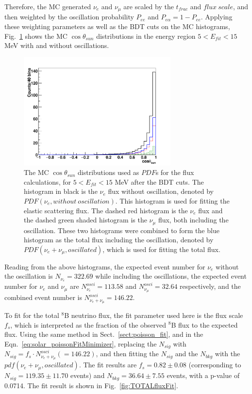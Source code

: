 Therefore, the MC generated $\nu_e$ and $\nu_\mu$ are scaled by the $t_{frac}$ and $flux~scale$, and then weighted by the oscillation probability $P_{ee}$ and $P_{e\alpha}=1-P_{ee}$. Applying these weighting parameters as well as the BDT cuts on the MC histograms, Fig.~\ref{fig:MCfluxPdfs} shows the MC $\cos\theta_{sun}$ distributions in the energy region $5<E_{fit}<15$ MeV with and without oscillations.

\begin{figure}[!htb]
	\centering
	\includegraphics[width=8cm]{MCfluxPdfs.png}
	\caption[The MC $\cos\theta_{sun}$ distributions used as $PDF$s for the flux calculations, for $5<E_{fit}<15$ MeV after the BDT cuts.]{The MC $\cos\theta_{sun}$ distributions used as $PDF$s for the flux calculations, for $5<E_{fit}<15$ MeV after the BDT cuts. The histogram in black is the $\nu_e$ flux without oscillation, denoted by $PDF(\nu_e,without~oscillation)$. This histogram is used for fitting the elastic scattering flux. The dashed red histogram is the $\nu_e$ flux and the dashed green shaded histogram is the $\nu_\mu$ flux, both including the oscillation. These two histograms were combined to form the blue histogram as the total flux including the oscillation, denoted by $PDF(\nu_e+\nu_\mu,oscillated)$, which is used for fitting the total flux.}
	\label{fig:MCfluxPdfs}
\end{figure} 

Reading from the above histograms, the expected event number for $\nu_e$ without the oscillation is $N_{\nu_e} = 322.69$ while including the oscillations, the expected event number for $\nu_e$ and $\nu_\mu$ are $N^{osci}_{\nu_e} = 113.58$ and $N^{osci}_{\nu_\mu} = 32.64$ respectively, and the combined event number is $N^{osci}_{\nu_e+\nu_\mu}=146.22$.

To fit for the total $^8$B neutrino flux, the fit parameter used here is the flux scale $f_s$, which is interpreted as the fraction of the observed $^8$B flux to the expected flux. Using the same method in Sect.~\ref{sect:poisson_fit}, and in the Eqn.~\ref{eq:solar_poissonFitMinimizer}, replacing the $N_{sig}$ with $N_{sig}=f_s\cdot N^{osci}_{\nu_e+\nu_\mu}(=146.22)$, and then fitting the $N_{sig}$ and the $N_{bkg}$ with the $pdf(\nu_e+\nu_\mu,oscillated)$. The fit results are $f_s=0.82\pm 0.08$ (corresponding to $N_{sig}=119.35\pm11.70$  events) and $N_{bkg}=36.64\pm7.55$ events, with a p-value of 0.0714. The fit result is shown in Fig.~\ref{fig:TOTALfluxFit}.

